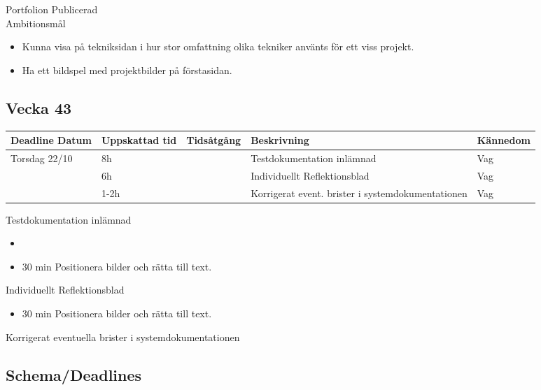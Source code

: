 \documentclass{TDP003mall}
\begin{document}
Portfolion Publicerad\\


Ambitionsmål
\begin{itemize}
  \item Kunna visa på tekniksidan i hur stor omfattning olika tekniker använts för ett viss projekt.
  \item Ha ett bildspel med projektbilder på förstasidan.
\end{itemize}

\subsection{Vecka 43}
\begin{tabularx}{\linewidth}{|l|l|l|X|l|}
	\hline
	Deadline Datum & Uppskattad tid & Tidsåtgång & Beskrivning                                       & Kännedom \\ [0.5ex]
	\hline
	Torsdag 22/10  & 8h             &            & Testdokumentation inlämnad                        & Vag      \\
	\hline
                   & 6h             &            & Individuellt Reflektionsblad                      & Vag      \\
	\hline
                   & 1-2h           &            & Korrigerat event. brister i systemdokumentationen & Vag      \\
	\hline
\end{tabularx}

Testdokumentation inlämnad\\
\begin{itemize}
  \item 
  \item 30 min Positionera bilder och rätta till text.
\end{itemize}

Individuellt Reflektionsblad\\
\begin{itemize}
  \item 30 min Positionera bilder och rätta till text.
  \end{itemize}
  
Korrigerat eventuella brister i systemdokumentationen\\


\subsection{Schema/Deadlines}
\end{document}
